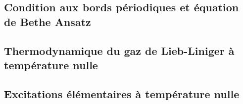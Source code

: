 \subsection{Condition aux bords périodiques et équation de Bethe Ansatz}

\subsection{Thermodynamique du gaz de Lieb-Liniger à température nulle}

\subsection{Excitations élémentaires à température nulle}